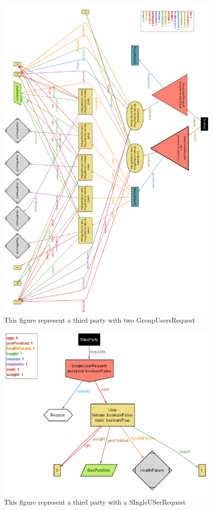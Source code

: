 \begin{figure}[h!]
	\includegraphics[width=1.00\textwidth]{./pictures/world2.png}\par
	\caption{This figure represent a third party with two GroupUsersRequest}
\end{figure}

\begin{figure}[h!]
	\includegraphics[width=1.00\textwidth]{./pictures/world1.png}\par
	\caption{This figure represent a third party with a SIngleUSerRequest}
\end{figure}